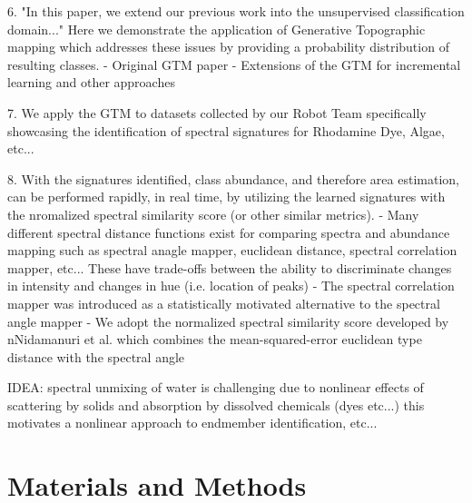 \documentclass[remotesensing,article,submit,pdftex,moreauthors]{Definitions/mdpi}
\begin{document}
6. "In this paper, we extend our previous work into the unsupervised classification domain..." Here we demonstrate the application of Generative Topographic mapping which addresses these issues by providing a probability distribution of resulting classes. 
    - Original GTM paper \cite{gtm-bishop-1}
    - Extensions of the GTM for incremental learning and other approaches \cite{gtm-bishop-2}

7. We apply the GTM to datasets collected by our Robot Team specifically showcasing the identification of spectral signatures for Rhodamine Dye, Algae, etc... 

8. With the signatures identified, class abundance, and therefore area estimation, can be performed rapidly, in real time, by utilizing the learned signatures with the nromalized spectral similarity score (or other similar metrics). 
    - Many different spectral distance functions exist for comparing spectra and abundance mapping such as spectral anagle mapper, euclidean distance, spectral correlation mapper, etc... These have trade-offs between the ability to discriminate changes in intensity and changes in hue (i.e. location of peaks) \cite{deborah2015comprehensive}
    - The spectral correlation mapper was introduced as a statistically motivated alternative to the spectral angle mapper \cite{de2000spectral}
    - We adopt the normalized spectral similarity score developed by nNidamanuri et al. which combines the mean-squared-error euclidean type distance with the spectral angle \cite{nidamanuri2010normalized}

IDEA: spectral unmixing of water is challenging due to nonlinear effects of scattering by solids and absorption by dissolved chemicals (dyes etc...) this motivates a nonlinear approach to endmember identification, etc...

\section{Materials and Methods}
\end{document}
